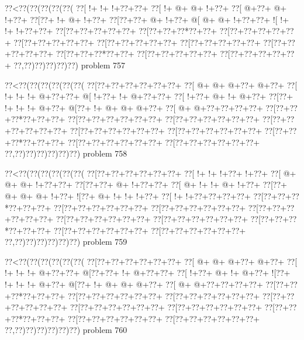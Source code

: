 \vbox{\vbox{\goo
\0??<\0??(\0??(\0??(\0??(\0??(
\0??[\- !+\- !+\- !+\0??+\0??+
\0??[\- !+\- @+\- @+\- !+\0??+
\0??[\- @+\0??+\- @+\- !+\0??+
\0??[\0??+\- !+\- @+\- !+\0??+
\0??[\0??+\0??+\- @+\- !+\0??+
\- @[\- @+\- @+\- !+\0??+\0??+
\- ![\- !+\- !+\- !+\0??+\0??+
\0??[\0??+\0??+\0??+\0??+\0??+
\0??[\0??+\0??+\0??*\0??+\0??+
\0??[\0??+\0??+\0??+\0??+\0??+
\0??[\0??+\0??+\0??+\0??+\0??+
\0??[\0??+\0??+\0??+\0??+\0??+
\0??[\0??+\0??+\0??+\0??+\0??+
\0??[\0??+\0??+\0??+\0??+\0??+
\0??[\0??+\0??+\0??*\0??+\0??+
\0??[\0??+\0??+\0??+\0??+\0??+
\0??[\0??+\0??+\0??+\0??+\0??+
\0??,\0??)\0??)\0??)\0??)\0??)
}
\hfil problem 757\hfil\break
}

\vbox{\vbox{\goo
\0??<\0??(\0??(\0??(\0??(\0??(\0??(
\0??[\0??+\0??+\0??+\0??+\0??+\0??+
\0??[\- @+\- @+\- @+\0??+\- @+\0??+
\0??[\- !+\- !+\- !+\- @+\0??+\0??+
\- @[\- !+\0??+\- !+\- @+\0??+\0??+
\0??[\- !+\0??+\- @+\- !+\- @+\0??+
\0??[\0??+\- !+\- !+\- !+\- @+\0??+
\- @[\0??+\- !+\- @+\- @+\- @+\0??+
\0??[\- @+\- @+\0??+\0??+\0??+\0??+
\0??[\0??+\0??+\0??*\0??+\0??+\0??+
\0??[\0??+\0??+\0??+\0??+\0??+\0??+
\0??[\0??+\0??+\0??+\0??+\0??+\0??+
\0??[\0??+\0??+\0??+\0??+\0??+\0??+
\0??[\0??+\0??+\0??+\0??+\0??+\0??+
\0??[\0??+\0??+\0??+\0??+\0??+\0??+
\0??[\0??+\0??+\0??*\0??+\0??+\0??+
\0??[\0??+\0??+\0??+\0??+\0??+\0??+
\0??[\0??+\0??+\0??+\0??+\0??+\0??+
\0??,\0??)\0??)\0??)\0??)\0??)\0??)
}
\hfil problem 758\hfil\break
}

\vbox{\vbox{\goo
\0??<\0??(\0??(\0??(\0??(\0??(\0??(
\0??[\0??+\0??+\0??+\0??+\0??+\0??+
\0??[\- !+\- !+\- !+\0??+\- !+\0??+
\0??[\- @+\- @+\- @+\- !+\0??+\0??+
\0??[\0??+\0??+\- @+\- !+\0??+\0??+
\0??[\- @+\- !+\- !+\- @+\- !+\0??+
\0??[\0??+\- @+\- @+\- @+\- !+\0??+
\- ![\0??+\- @+\- !+\- !+\- !+\0??+
\0??[\- !+\- !+\0??+\0??+\0??+\0??+
\0??[\0??+\0??+\0??*\0??+\0??+\0??+
\0??[\0??+\0??+\0??+\0??+\0??+\0??+
\0??[\0??+\0??+\0??+\0??+\0??+\0??+
\0??[\0??+\0??+\0??+\0??+\0??+\0??+
\0??[\0??+\0??+\0??+\0??+\0??+\0??+
\0??[\0??+\0??+\0??+\0??+\0??+\0??+
\0??[\0??+\0??+\0??*\0??+\0??+\0??+
\0??[\0??+\0??+\0??+\0??+\0??+\0??+
\0??[\0??+\0??+\0??+\0??+\0??+\0??+
\0??,\0??)\0??)\0??)\0??)\0??)\0??)
}
\hfil problem 759\hfil\break
}

\vbox{\vbox{\goo
\0??<\0??(\0??(\0??(\0??(\0??(\0??(
\0??[\0??+\0??+\0??+\0??+\0??+\0??+
\0??[\- @+\- @+\- @+\0??+\- @+\0??+
\0??[\- !+\- !+\- !+\- @+\0??+\0??+
\- @[\0??+\0??+\- !+\- @+\0??+\0??+
\0??[\- !+\0??+\- @+\- !+\- @+\0??+
\- ![\0??+\- !+\- !+\- !+\- @+\0??+
\- @[\0??+\- !+\- @+\- @+\- @+\0??+
\0??[\- @+\- @+\0??+\0??+\0??+\0??+
\0??[\0??+\0??+\0??*\0??+\0??+\0??+
\0??[\0??+\0??+\0??+\0??+\0??+\0??+
\0??[\0??+\0??+\0??+\0??+\0??+\0??+
\0??[\0??+\0??+\0??+\0??+\0??+\0??+
\0??[\0??+\0??+\0??+\0??+\0??+\0??+
\0??[\0??+\0??+\0??+\0??+\0??+\0??+
\0??[\0??+\0??+\0??*\0??+\0??+\0??+
\0??[\0??+\0??+\0??+\0??+\0??+\0??+
\0??[\0??+\0??+\0??+\0??+\0??+\0??+
\0??,\0??)\0??)\0??)\0??)\0??)\0??)
}
\hfil problem 760\hfil\break
}

